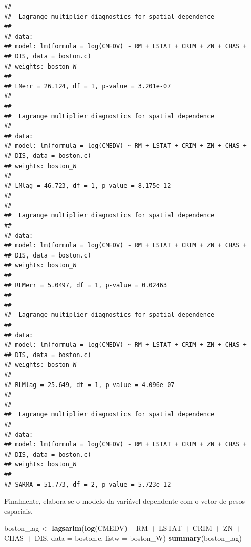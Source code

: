 \documentclass[12pt,]{article}
\newenvironment{Shaded}{\begin{snugshade}}{\end{snugshade}}
\newcommand{\KeywordTok}[1]{\textcolor[rgb]{0.13,0.29,0.53}{\textbf{#1}}}
\newcommand{\DataTypeTok}[1]{\textcolor[rgb]{0.13,0.29,0.53}{#1}}
\newcommand{\StringTok}[1]{\textcolor[rgb]{0.31,0.60,0.02}{#1}}
\newcommand{\OperatorTok}[1]{\textcolor[rgb]{0.81,0.36,0.00}{\textbf{#1}}}
\newcommand{\NormalTok}[1]{#1}
\begin{document}
\begin{verbatim}
## 
##  Lagrange multiplier diagnostics for spatial dependence
## 
## data:  
## model: lm(formula = log(CMEDV) ~ RM + LSTAT + CRIM + ZN + CHAS +
## DIS, data = boston.c)
## weights: boston_W
## 
## LMerr = 26.124, df = 1, p-value = 3.201e-07
## 
## 
##  Lagrange multiplier diagnostics for spatial dependence
## 
## data:  
## model: lm(formula = log(CMEDV) ~ RM + LSTAT + CRIM + ZN + CHAS +
## DIS, data = boston.c)
## weights: boston_W
## 
## LMlag = 46.723, df = 1, p-value = 8.175e-12
## 
## 
##  Lagrange multiplier diagnostics for spatial dependence
## 
## data:  
## model: lm(formula = log(CMEDV) ~ RM + LSTAT + CRIM + ZN + CHAS +
## DIS, data = boston.c)
## weights: boston_W
## 
## RLMerr = 5.0497, df = 1, p-value = 0.02463
## 
## 
##  Lagrange multiplier diagnostics for spatial dependence
## 
## data:  
## model: lm(formula = log(CMEDV) ~ RM + LSTAT + CRIM + ZN + CHAS +
## DIS, data = boston.c)
## weights: boston_W
## 
## RLMlag = 25.649, df = 1, p-value = 4.096e-07
## 
## 
##  Lagrange multiplier diagnostics for spatial dependence
## 
## data:  
## model: lm(formula = log(CMEDV) ~ RM + LSTAT + CRIM + ZN + CHAS +
## DIS, data = boston.c)
## weights: boston_W
## 
## SARMA = 51.773, df = 2, p-value = 5.723e-12
\end{verbatim}

Finalmente, elabora-se o modelo da variável dependente com o vetor de
pesos espaciais.

\begin{Shaded}
\begin{Highlighting}[]
\NormalTok{boston_lag <-}\StringTok{ }\KeywordTok{lagsarlm}\NormalTok{(}\KeywordTok{log}\NormalTok{(CMEDV) }\OperatorTok{~}\StringTok{ }\NormalTok{RM }\OperatorTok{+}\StringTok{ }\NormalTok{LSTAT }\OperatorTok{+}\StringTok{ }\NormalTok{CRIM }\OperatorTok{+}\StringTok{ }\NormalTok{ZN }\OperatorTok{+}\StringTok{ }\NormalTok{CHAS }\OperatorTok{+}\StringTok{ }\NormalTok{DIS, }
                       \DataTypeTok{data =}\NormalTok{ boston.c, }\DataTypeTok{listw =}\NormalTok{ boston_W)}
\KeywordTok{summary}\NormalTok{(boston_lag)}
\end{Highlighting}
\end{Shaded}
\end{document}
